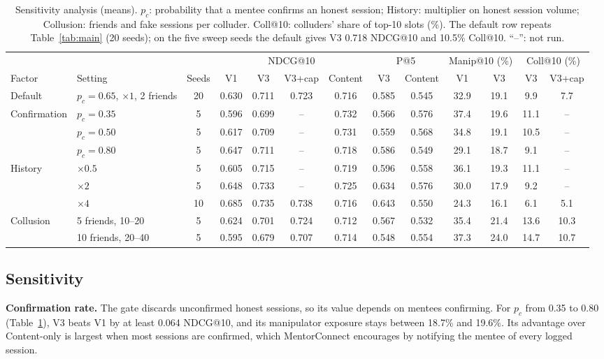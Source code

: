 \documentclass[conference]{IEEEtran}
\begin{document}
\begin{table}[t]
\centering
\caption{Sensitivity analysis (means). $p_c$: probability that a mentee confirms an honest session; History: multiplier on honest session volume; Collusion: friends and fake sessions per colluder. Coll@10: colluders' share of top-10 slots (\%). The default row repeats Table~\ref{tab:main} (20 seeds); on the five sweep seeds the default gives V3 0.718 NDCG@10 and 10.5\% Coll@10. ``--'': not run.}
\label{tab:sens}
\footnotesize
\setlength{\tabcolsep}{4.5pt}
\renewcommand{\arraystretch}{1.1}
\begin{tabular}{llc cccc cc cc cc}
\toprule
 & & & \multicolumn{4}{c}{NDCG@10} & \multicolumn{2}{c}{P@5} & \multicolumn{2}{c}{Manip@10 (\%)} & \multicolumn{2}{c}{Coll@10 (\%)} \\
\cmidrule(lr){4-7}\cmidrule(lr){8-9}\cmidrule(lr){10-11}\cmidrule(lr){12-13}
Factor & Setting & Seeds & V1 & V3 & V3+cap & Content & V3 & Content & V1 & V3 & V3 & V3+cap \\
\midrule
Default & $p_c{=}0.65$, $\times1$, 2 friends & 20 & 0.630 & 0.711 & 0.723 & 0.716 & 0.585 & 0.545 & 32.9 & 19.1 & 9.9 & 7.7 \\
\midrule
\multirow{3}{*}{Confirmation} & $p_c=0.35$ & 5 & 0.596 & 0.699 & -- & 0.732 & 0.566 & 0.576 & 37.4 & 19.6 & 11.1 & -- \\
 & $p_c=0.50$ & 5 & 0.617 & 0.709 & -- & 0.731 & 0.559 & 0.568 & 34.8 & 19.1 & 10.5 & -- \\
 & $p_c=0.80$ & 5 & 0.647 & 0.711 & -- & 0.718 & 0.586 & 0.549 & 29.1 & 18.7 & 9.1 & -- \\
\midrule
\multirow{3}{*}{History} & $\times0.5$ & 5 & 0.605 & 0.715 & -- & 0.719 & 0.596 & 0.558 & 36.1 & 19.3 & 11.1 & -- \\
 & $\times2$ & 5 & 0.648 & 0.733 & -- & 0.725 & 0.634 & 0.576 & 30.0 & 17.9 & 9.2 & -- \\
 & $\times4$ & 10 & 0.685 & 0.735 & 0.738 & 0.716 & 0.643 & 0.550 & 24.3 & 16.1 & 6.1 & 5.1 \\
\midrule
\multirow{2}{*}{Collusion} & 5 friends, 10--20 & 5 & 0.624 & 0.701 & 0.724 & 0.712 & 0.567 & 0.532 & 35.4 & 21.4 & 13.6 & 10.3 \\
 & 10 friends, 20--40 & 5 & 0.595 & 0.679 & 0.707 & 0.714 & 0.548 & 0.554 & 37.3 & 24.0 & 14.7 & 10.7 \\
\bottomrule
\end{tabular}
\end{table}

\subsection{Sensitivity}
\textbf{Confirmation rate.} The gate discards unconfirmed honest sessions, so its value depends on mentees confirming. For $p_c$ from 0.35 to 0.80 (Table~\ref{tab:sens}), V3 beats V1 by at least 0.064 NDCG@10, and its manipulator exposure stays between 18.7\% and 19.6\%. Its advantage over Content-only is largest when most sessions are confirmed, which MentorConnect encourages by notifying the mentee of every logged session.
\end{document}
